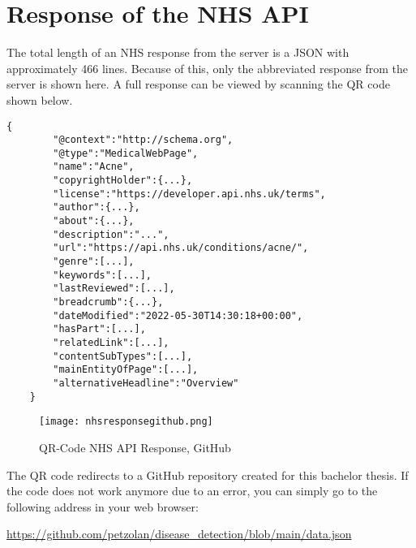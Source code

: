 \section{Response of the NHS API}
The total length of an NHS response from the server is a JSON with approximately 466 lines. Because of this, only the abbreviated response from the server is shown here. A full response can be viewed by scanning the QR code shown below. 
\begin{lstlisting}[caption={Abbreviated Response of NHS API}]
	{
		"@context":"http://schema.org",
		"@type":"MedicalWebPage",
		"name":"Acne",
		"copyrightHolder":{...},
		"license":"https://developer.api.nhs.uk/terms",
		"author":{...},
		"about":{...},
		"description":"...",
		"url":"https://api.nhs.uk/conditions/acne/",
		"genre":[...],
		"keywords":[...],
		"lastReviewed":[...],
		"breadcrumb":{...},
		"dateModified":"2022-05-30T14:30:18+00:00",
		"hasPart":[...],
		"relatedLink":[...],
		"contentSubTypes":[...],
		"mainEntityOfPage":[...],
		"alternativeHeadline":"Overview"
	}
\end{lstlisting}
\begin{figure}[H]
	\centering
	\texttt{[image: nhsresponsegithub.png]}
	\caption{QR-Code NHS API Response, GitHub}
\end{figure}
The QR code redirects to a GitHub repository created for this bachelor thesis. If the code does not work anymore due to an error, you can simply go to the following address in your web browser:
\begin{center}
	\url{https://github.com/petzolan/disease_detection/blob/main/data.json}
\end{center}
\pagebreak
